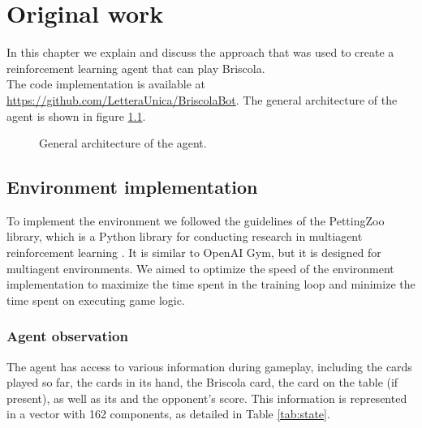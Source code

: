 \chapter{Original work}

In this chapter we explain and discuss the approach that was used to create a reinforcement learning agent that can play Briscola.\\
The code implementation is available at \url{https://github.com/LetteraUnica/BriscolaBot}.
The general architecture of the agent is shown in figure \ref{fig:general-architecture}.

\begin{figure}[H]
    \centering
    
    \caption{General architecture of the agent.}
    \label{fig:general-architecture}
\end{figure}

\section{Environment implementation}
To implement the environment we followed the guidelines of the PettingZoo library, which is a Python library for conducting research in multiagent reinforcement learning \cite{pettingzoo}. It is similar to OpenAI Gym, but it is designed for multiagent environments. We aimed to optimize the speed of the environment implementation to maximize the time spent in the training loop and minimize the time spent on executing game logic.

\subsection{Agent observation}
The agent has access to various information during gameplay, including the cards played so far, the cards in its hand, the Briscola card, the card on the table (if present), as well as its and the opponent's score. This information is represented in a vector with 162 components, as detailed in Table \ref{tab:state}.

